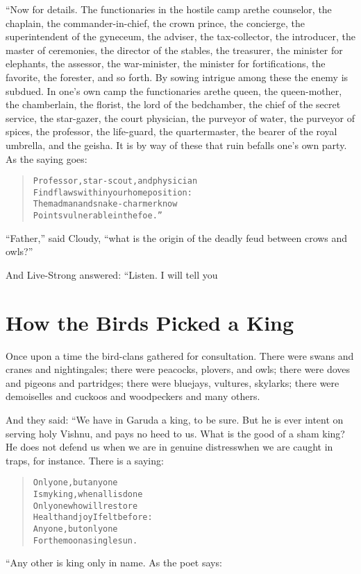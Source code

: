 \documentclass[article, twoside, 14pt]{memoir}
\renewenvironment{verbatim}{%
\begin{quote}%
\vskip -10pt%
\begin{alltt}\normalfont\large}{\end{alltt}%
\end{quote}%
\vskip -10pt
} %
\begin{document}
“Now for details. The functionaries in the hostile camp are{\textemdash}the
counselor, the chaplain, the commander-in-chief, the crown prince,
the concierge, the superintendent of the gyneceum, the adviser, the
tax-collector, the introducer, the master of ceremonies, the
director of the stables, the treasurer, the minister for elephants,
the assessor, the war-minister, the minister for fortifications,
the favorite, the forester, and so forth. By sowing intrigue among
these the enemy is subdued. In one's own camp the functionaries
are{\textemdash}the queen, the queen-mother, the chamberlain, the florist,
the lord of the bedchamber, the chief of the secret service, the
star-gazer, the court physician, the purveyor of water, the
purveyor of spices, the professor, the life-guard, the
quartermaster, the bearer of the royal umbrella, and the geisha. It
is by way of these that ruin befalls one's own party. As the saying
goes:

\begin{verbatim}
Professor, star-scout, and physician
Find flaws within your home position:
The madman and snake-charmer know
Points vulnerable in the foe.”
\end{verbatim}
``Father,'' said Cloudy,
``what is the origin of the deadly feud between crows and owls?''

And Live-Strong answered: “Listen. I will tell you

\chapter{How the Birds Picked a King}

\label{s48}

Once upon a time the bird-clans gathered for consultation. There
were swans and cranes and nightingales; there were peacocks,
plovers, and owls; there were doves and pigeons and partridges;
there were bluejays, vultures, skylarks; there were demoiselles and
cuckoos and woodpeckers and many others.

And they said: “We have in Garuda a king, to be sure. But he is
ever intent on serving holy Vishnu, and pays no heed to us. What is
the good of a sham king? He does not defend us when we are in
genuine distress{\textemdash}when we are caught in traps, for instance. There
is a saying:

\begin{verbatim}
Only one, but anyone
Is my king, when all is done{\textemdash}
Only one who will restore
Health and joy I felt before:
Anyone, but only one{\textemdash}
For the moon a single sun.
\end{verbatim}
“Any other is king only in name. As the poet says:
\end{document}
